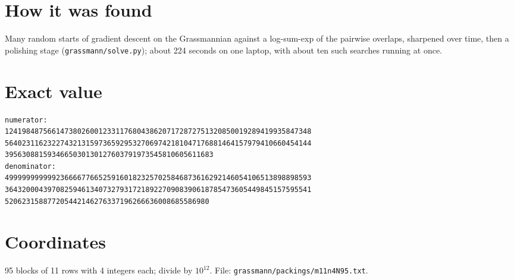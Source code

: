 \documentclass[11pt,a4paper]{article}
\begin{document}
\section{How it was found}
Many random starts of gradient descent on the Grassmannian against a log-sum-exp of the pairwise overlaps, sharpened over time, then a polishing stage (\texttt{grassmann/solve.py}); about 224 seconds on one laptop, with about ten such searches running at once.


\appendix
\section{Exact value}
{\small
\begin{verbatim}
numerator:
124198487566147380260012331176804386207172872751320850019289419935847348
564023116232274321315973659295327069742181047176881464157979410660454144
3956308815934665030130127603791973545810605611683
denominator:
499999999999236666776652591601823257025846873616292146054106513898898593
364320004397082594613407327931721892270908390618785473605449845157595541
520623158877205442146276337196266636008685586980
\end{verbatim}}

\section{Coordinates}
95 blocks of 11 rows with 4 integers each; divide by $10^{12}$. File: \texttt{grassmann/packings/m11n4N95.txt}.
{\tiny
\begin{multicols}{3}
\end{multicols}}
\end{document}
